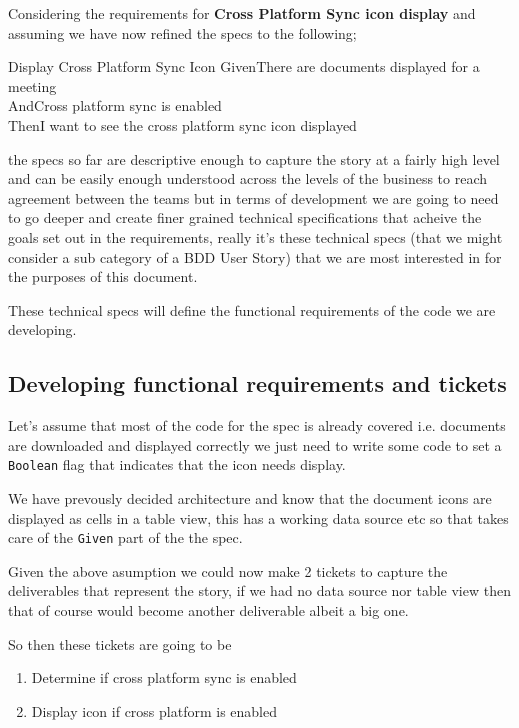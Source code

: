\documentclass[a4paper, titlepage]{article}
\begin{document}
  Considering the requirements for \textbf{Cross Platform Sync icon display}
  and assuming we have now refined the specs to the following;

  \begin{tspec}{1}{Display Cross Platform Sync Icon}
    \ac{Given}{There are documents displayed for a meeting}\\
    \ac{And}{Cross platform sync is enabled}\\
    \ac{Then}{I want to see the cross platform sync icon displayed}
  \end{tspec}

  the specs so far are descriptive enough to capture
  the story at a fairly high level and can be easily enough
  understood across the levels of the business  to reach agreement
  between the teams but in terms of
  development we are going to need to go deeper and create finer grained
  technical specifications that acheive the goals set out in the
  requirements, really it's these technical specs
  (that we might consider a sub category of a BDD User Story) that we
  are most interested in for the purposes of this document.

  These technical specs will define the functional requirements of the code we are
  developing.

  \subsection{Developing functional requirements and tickets}
   Let's assume that most of the code for the spec is already covered i.e. documents
  are downloaded and displayed correctly we just need to write some code
  to set a \texttt{Boolean} flag that indicates that the icon needs display.

  We have prevously decided architecture and know that the document
  icons are displayed as cells in a table view, this has a working data
  source etc so that takes care of the \texttt{Given} part of the the
  spec. 

  Given the above asumption we could now make 2 tickets to capture the
  deliverables that represent the story, if we had no data source nor
  table view then that of course would become another deliverable
  albeit a big one.
  
  So then these tickets are going to be 

  \begin{enumerate}
    \item{Determine if cross platform sync is enabled}
    \item{Display icon if cross platform is enabled}
  \end{enumerate}
\end{document}
